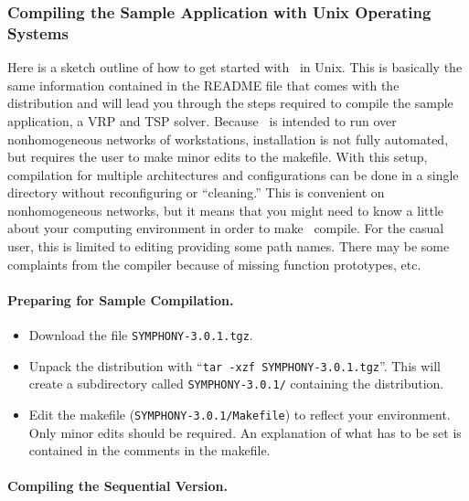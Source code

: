 \subsubsection{Compiling the Sample Application with Unix Operating Systems}
\label{getting_strated_unix}

Here is a sketch outline of how to get started with \BB\ in Unix. This is
basically the same information contained in the README file that comes with
the distribution and will lead you through the steps required to compile the
sample application, a VRP and TSP solver. Because \BB\ is intended to run over
nonhomogeneous networks of workstations, installation is not fully automated,
but requires the user to make minor edits to the makefile.  With this setup,
compilation for multiple architectures and configurations can be done in a
single directory without reconfiguring or ``cleaning.'' This is convenient on
nonhomogeneous networks, but it means that you might need to know a little
about your computing environment in order to make \BB\ compile. For the casual
user, this is limited to editing providing some path names. There may be some
complaints from the compiler because of missing function prototypes, etc.

\paragraph{Preparing for Sample Compilation.}

\begin{itemize}

        \item Download the file {\tt SYMPHONY-3.0.1.tgz}.

        \item Unpack the distribution with ``{\tt tar -xzf
        SYMPHONY-3.0.1.tgz}''. This will create a subdirectory called
        {\tt SYMPHONY-3.0.1/} containing the distribution.
        
        \item Edit the makefile ({\tt SYMPHONY-3.0.1/Makefile}) to reflect your
	environment. Only minor edits should be required. An explanation of
	what has to be set is contained in the comments in the makefile.

\end{itemize}
        
\paragraph{Compiling the Sequential Version.}

